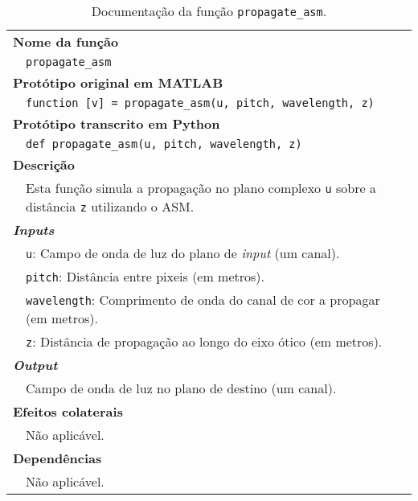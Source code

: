 \begin{table}[!hp]
    \centering
    \caption[Documentação da função \texttt{propagate\_asm}]{Documentação da função \texttt{propagate\_asm}\cite{Gilles2018}.}
    \label{tab:propagate_asm}
    \begin{tabular}{p{1cm} p{11.5cm}}
        \hline
        \multicolumn{2}{l}{\bfseries\small Nome da função}\\
         & \verb|propagate_asm|\\
        \hline
        \multicolumn{2}{l}{\bfseries\small Protótipo original em MATLAB}\\
         & \texttt{function [v] = propagate_asm(u, pitch, wavelength, z)}\\
        \hline
        \multicolumn{2}{l}{\bfseries\small Protótipo transcrito em Python}\\
         & \texttt{def propagate_asm(u, pitch, wavelength, z)} \\
        \hline\multicolumn{2}{l}{\bfseries\small Descrição}\\
         & Esta função simula a propagação no plano complexo \verb|u| sobre a distância \verb|z| utilizando o \ac{ASM}.\\
        \hline\multicolumn{2}{l}{\bfseries\small \textit{Inputs}}\\
         & \verb|u|: Campo de onda de luz do plano de \textit{input} (um canal).\\
         & \verb|pitch|: Distância entre pixeis (em metros).\\
         & \verb|wavelength|: Comprimento de onda do canal de cor a propagar (em metros).\\
         & \verb|z|: Distância de propagação ao longo do eixo ótico (em metros).\\
        \hline\multicolumn{2}{l}{\bfseries\small \textit{Output}}\\
         & Campo de onda de luz no plano de destino (um canal).\\
        \hline\multicolumn{2}{l}{\bfseries\small Efeitos colaterais}\\
         & Não aplicável. \\
        \hline\multicolumn{2}{l}{\bfseries\small Dependências}\\
         & Não aplicável. \\
        \hline
    \end{tabular}
\end{table}


